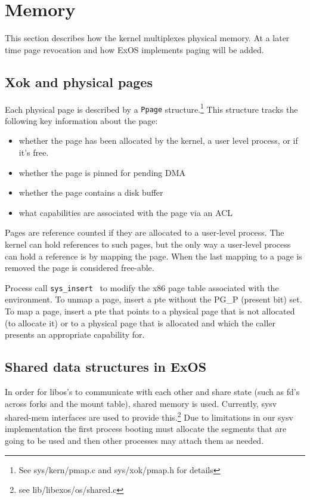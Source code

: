 \section{Memory}

This section describes how the kernel multiplexes physical memory. At
a later time page revocation and how ExOS implements paging will be
added.

\subsection {Xok and physical pages}

Each physical page is described by a {\tt Ppage}
structure.\footnote{See sys/kern/pmap.c and sys/xok/pmap.h for
details} This structure tracks the following key information about the
page:

\begin{itemize}
\item whether the page has been allocated by the kernel, a user level
process, or if it's free.

\item whether the page is pinned for pending DMA

\item whether the page contains a disk buffer

\item what capabilities are associated with the page via an ACL
\end{itemize}

Pages are reference counted if they are allocated to a user-level
process.  The kernel can hold references to such pages, but the only
way a user-level process can hold a reference is by mapping the
page. When the last mapping to a page is removed the page is
considered free-able.

Process call {\tt sys\_insert } to modify the x86 page table
associated with the environment. To unmap a page, insert a pte without
the PG\_P (present bit) set. To map a page, insert a pte that points
to a physical page that is not allocated (to allocate it) or to a
physical page that is allocated and which the caller presents an
appropriate capability for.

\subsection {Shared data structures in ExOS}

In order for libos's to communicate with each other and share state
(such as fd's across forks and the mount table), shared memory is
used. Currently, sysv shared-mem interfaces are used to provide
this.\footnote{see lib/libexos/os/shared.c} Due to limitations in our
sysv implementation the first process booting must allocate the
segments that are going to be used and then other processes may attach
them as needed.

